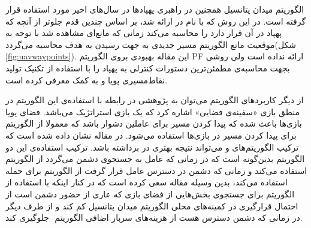 الگوریتم میدان پتانسیل همچنین در راهبری پهپادها در سال‌های اخیر مورد استفاده قرار گرفته است. در این روش که با نام  در  ارائه شد، بر اساس  چندین قدم جلوتر از آنچه که پهپاد در آن قرار دارد را محاسبه می‌کند زمانی که مانع‌ای مشاهده شد با توجه به موقعیت مانع الگوریتم  مسیر جدیدی به جهت رسیدن به هدف محاسبه می‌گردد(شکل \ref{fig:uavwaypoints}). این مقاله بهبودی بروی الگوریتم PF ارائه نداده است ولی روشی بجهت محاسبه‌ی مطمئن‌ترین دستورات کنترلی به پهپاد را با استفاده از تکنیک تولید نقاط‌مسیری پویا و به کمک  معرفی کرده است.


از دیگر کاربردهای الگوریتم  می‌توان به پژوهشی در رابطه با استفاده‌ی این الگوریتم در منطق بازی «سفینه‌ی فضایی» اشاره کرد که یک بازی استراتژیک می‌باشد. فضای پویا بازی‌ها باعث شده که پیدا کردن مسیر برای عاملین دشوار باشد که معمولا از الگوریتم  برای پیدا کردن مسیر در بازی‌ها استفاده می‌شود. در مقاله نشان داده شده است که ترکیب الگوریتم‌های  و  می‌تواند نتیجه بهتری در برداشته باشد. ترکیب استفاده‌ی این دو الگوریتم بدین‌گونه است که در زمانی که عامل به جستجوی دشمن می‌گردد از الگوریتم  استفاده می‌کند و زمانی که دشمن در دسترس عامل قرار گرفت از الگوریتم  برای حمله استفاده می‌کند، بدین وسیله مقاله سعی کرده است که در کنار اینکه با استفاده از الگوریتم  برای جستجوی بخش‌هایی از فضای بازی که عاری از حضور دشمن است از احتمال قرارگیری در کمینه‌های محلی الگوریتم میدان پتانسیل کم کند و از طرف دیگر در زمانی که دشمن دسترس هست از هزینه‌های سربار اضافی الگوریتم ‌‌ جلوگیری کند.